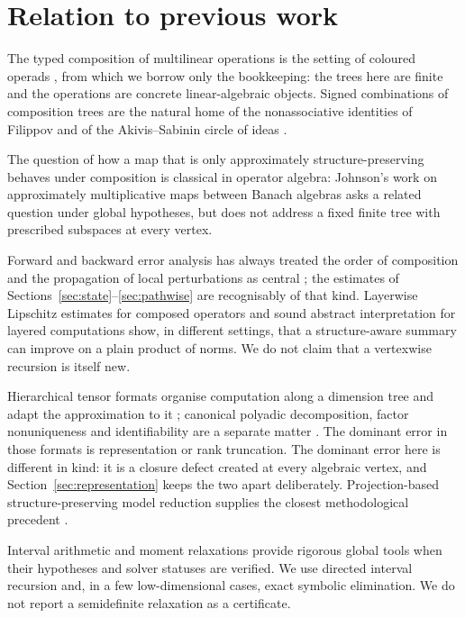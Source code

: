 \documentclass[11pt]{amsart}
\theoremstyle{definition}
\theoremstyle{remark}
\begin{document}
\section{Relation to previous work}
\label{sec:priorwork}

The typed composition of multilinear operations is the setting of coloured operads
\cite{Yau2016,LodayVallette2012}, from which we borrow only the bookkeeping: the trees
here are finite and the operations are concrete linear-algebraic objects. Signed
combinations of composition trees are the natural home of the nonassociative identities
of Filippov \cite{Filippov1985} and of the Akivis--Sabinin circle of ideas
\cite{MostovoyPerezIzquierdoShestakov2014}.

The question of how a map that is only approximately structure-preserving behaves under
composition is classical in operator algebra: Johnson's work on approximately
multiplicative maps between Banach algebras \cite{Johnson1988} asks a related question
under global hypotheses, but does not address a fixed finite tree with prescribed
subspaces at every vertex.

Forward and backward error analysis has always treated the order of composition and the
propagation of local perturbations as central \cite{Higham2002}; the estimates of
Sections~\ref{sec:state}--\ref{sec:pathwise} are recognisably of that kind. Layerwise
Lipschitz estimates for composed operators \cite{CombettesPesquet2020} and sound abstract
interpretation for layered computations \cite{GehrEtAl2018} show, in different settings,
that a structure-aware summary can improve on a plain product of norms. We do not claim
that a vertexwise recursion is itself new.

Hierarchical tensor formats organise computation along a dimension tree and adapt the
approximation to it \cite{HackbuschKuhn2009,BallaniGrasedyck2014}; canonical polyadic
decomposition, factor nonuniqueness and identifiability are a separate matter
\cite{KoldaBader2009,Kruskal1977}. The dominant error in those formats is representation
or rank truncation. The dominant error here is different in kind: it is a closure defect
created at every algebraic vertex, and Section~\ref{sec:representation} keeps the two
apart deliberately. Projection-based structure-preserving model reduction supplies the
closest methodological precedent \cite{EggerEtAl2018}.

Interval arithmetic \cite{MooreKearfottCloud2009} and moment relaxations
\cite{Lasserre2001} provide rigorous global tools when their hypotheses and solver
statuses are verified. We use directed interval recursion and, in a few low-dimensional
cases, exact symbolic elimination. We do not report a semidefinite relaxation as a
certificate.
\end{document}
